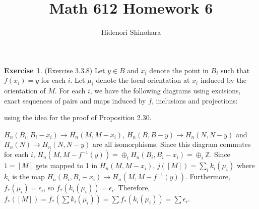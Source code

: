 \documentclass[12pt, psamsfonts]{amsart}
\theoremstyle{definition}
\newtheorem*{exer}{Exercise}
\theoremstyle{remark}
\numberwithin{equation}{section}
\begin{document}
\title{Math 612 Homework 6}
\author{Hidenori Shinohara}
\maketitle

% 


\begin{exer}{(Exercise 3.3.8)}
  Let $y \in B$ and $x_i$ denote the point in $B_i$ such that $f(x_i) = y$ for each $i$.
  Let $\mu_i$ denote the local orientation at $x_i$ induced by the orientation of $M$.
  For each $i$, we have the following diagrams using excisions, exact sequences of pairs and maps induced by $f$, inclusions and projections:
  \begin{center}
  \end{center}
  using the idea for the proof of Proposition 2.30.

  $H_n(B_i, B_i - x_i) \rightarrow H_n(M, M - x_i)$, $H_n(B, B - y) \rightarrow H_n(N, N - y)$ and $H_n(N) \rightarrow H_n(N, N - y)$ are all isomorphisms.
  Since this diagram commutes for each $i$, $H_n(M, M - f^{-1}(y)) = \oplus_{i} H_n(B_i, B_i - x_i) = \oplus_{i} \mathbb{Z}$.
  Since $1 = [M]$ gets mapped to 1 in $H_n(M, M - x_i)$, $j([M]) = \sum_i k_i(\mu_i)$ where $k_i$ is the map $H_n(B_i, B_i - x_i) \rightarrow H_n(M, M - f^{-1}(y))$.
  Furthermore, $f_{\ast}(\mu_i) = \epsilon_i$, so $f_{\ast}(k_i(\mu_i)) = \epsilon_i$.
  Therefore, $f_{\ast}([M]) = f_{\ast}(\sum k_i(\mu_i)) = \sum f_{\ast}(k_i(\mu_i)) = \sum \epsilon_i$.
\end{exer}
\end{document}
